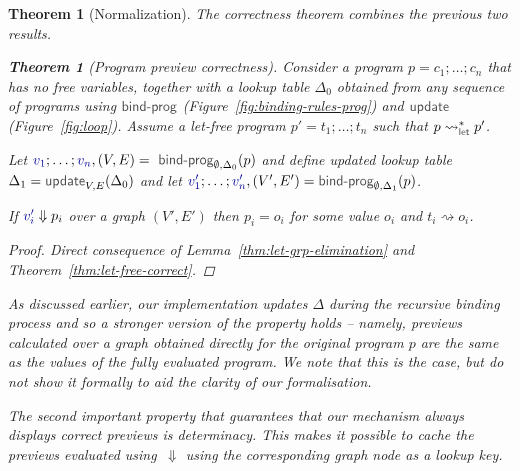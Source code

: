 \documentclass[acmsmall,anonymous,fleqn]{acmart}\settopmatter{printfolios=false,printccs=false,printacmref=false}
\newcounter{thc}
\theoremstyle{plain}
\newtheorem{theorem}[thc]{Theorem}
\theoremstyle{definition}
\newcommand{\ident}[1]{\textnormal{\textcolor{idclr}{\sffamily #1}}}
\newcommand{\bndclr}[1]{\textcolor{kvdclr}{#1}}
\begin{document}
\begin{theorem}[Normalization]
\noindent
The correctness theorem combines the previous two results.

\begin{theorem}[Program preview correctness]
\label{thm:correcntess}
Consider a program $p=c_1;\ldots;c_n$ that has no free variables, together with a lookup table
$\Delta_0$ obtained from any sequence of programs using $\ident{bind-prog}$
(Figure~\ref{fig:binding-rules-prog}) and $\ident{update}$ (Figure~\ref{fig:loop}). Assume a
let-free program $p'=t_1;\ldots;t_n$ such that $p\rightsquigarrow^{*}_\ident{let}p'$.

\vspace{0.25em}
\noindent
Let $\bndclr{v_1};\ldots;\bndclr{v_n}, (V, E) = \ident{bind-prog}_{\emptyset, \Delta_0}(p)$
and define updated lookup table $\Delta_1=\ident{update}_{V, E}(\Delta_0)$ and
let $\bndclr{v'_1};\ldots;\bndclr{v'_n}, (V', E') = \ident{bind-prog}_{\emptyset, \Delta_1}(p)$.

\vspace{0.25em}
\noindent
If $\bndclr{v'_i}\Downarrow p_i$ over a graph $(V', E')$ then $p_i=o_i$ for some value $o_i$ and
$t_i \rightsquigarrow o_i$.
\end{theorem}
\begin{proof}
Direct consequence of Lemma~\ref{thm:let-grp-elimination} and Theorem~\ref{thm:let-free-correct}.
\end{proof}

As discussed earlier, our implementation updates $\Delta$ during the recursive binding process and
so a stronger version of the property holds -- namely, previews calculated over a graph obtained
directly for the original program $p$ are the same as the values of the fully evaluated program.
We note that this is the case, but do not show it formally to aid the clarity of our formalisation.

The second important property that guarantees that our mechanism always displays correct previews
is determinacy. This makes it possible to cache the previews evaluated using~$\Downarrow$ using
the corresponding graph node as a lookup key.


\end{theorem}
\end{document}
